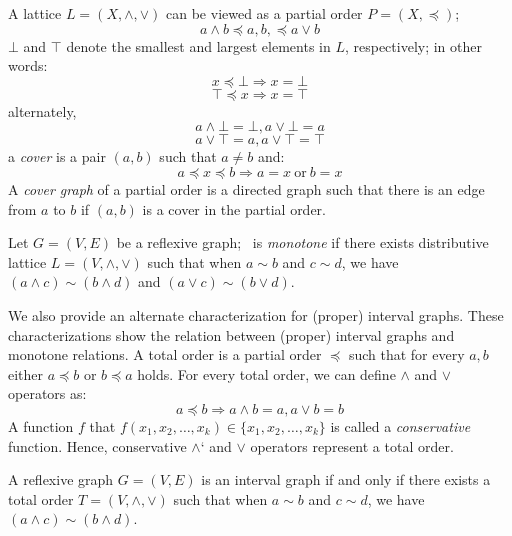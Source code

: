 A lattice \(L=(X,\wedge,\vee)\) can be viewed as a partial order \(P=(X,\preceq)\);
\[ a\wedge b \preceq a,b, \preceq a\vee b\]
\(\bot\) and \(\top\) denote the smallest and largest elements in \(L\), respectively; in other words:
\[x \preceq \bot \Rightarrow x = \bot \]
\[\top \preceq x \Rightarrow x = \top \]
alternately,
\[a \wedge \bot = \bot, a \vee \bot = a\]
\[a \vee \top = a, a \vee \top = \top\]
a \emph{cover} is a pair \((a,b)\) such that \(a \neq b\) and:
\[a \preceq x \preceq b \Rightarrow a = x\ \mathrm{or}\ b = x\]
A \emph{cover graph} of a partial order is a directed graph such that there is
an edge from \(a\) to \(b\) if \((a,b)\) is a cover in the partial order.


\begin{defi} 
Let \(G=(V,E)\) be a reflexive graph; \mG\ is \emph{monotone} if there exists distributive lattice
\(L=(V, \wedge, \vee)\) such that
when \(a\sim b\) and \(c \sim d\), we have \((a \wedge c) \sim (b \wedge d)\) and \((a \vee c) \sim (b \vee d)\)\@.
\end{defi}

We also provide an alternate characterization for (proper) interval graphs.
These characterizations show the relation between (proper) interval graphs and monotone relations. 
A total order is a partial order \(\preceq\) such that for every \(a, b\) either \(a \preceq b\)
or \(b \preceq a\) holds. For every total order, we can define \(\wedge\) and \(\vee\) operators as:
\[a \preceq b \Rightarrow a \wedge b = a, a \vee b = b\]
A function \(f\) that \(f(x_1,x_2,\dotsc,x_k)\in \{x_1,x_2,\dotsc,x_k\}\) is called
a \emph{conservative} function. Hence, conservative \(\wedge\)` and \(\vee\) operators
represent a total order.

\begin{theorem}  \label{thm:semimin}
A reflexive graph \(G=(V,E)\) is an interval graph if and only if there exists
a total order \(T=(V,\wedge,\vee)\) such that
when \(a\sim b\) and \(c \sim d\), we have \((a \wedge c) \sim (b \wedge d)\)\@.
\end{theorem}


